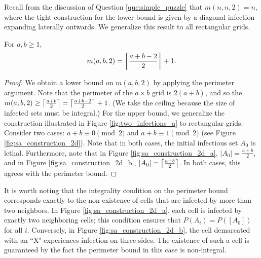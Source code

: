 Recall from the discussion of Question \ref{que:simple_puzzle} that $m(n, n,2) = n$, where the tight construction for the lower bound is given by a diagonal infection expanding laterally outwards. We generalize this result to all rectangular grids.

\begin{thm}
For $a, b \geq 1$,
$$m(a,b,2) = \ceil*{\frac{a+b-2}{2}}+1.$$
\end{thm}

\begin{proof}
We obtain a lower bound on $m(a,b,2)$ by applying the perimeter argument. Note that the perimeter of the $a \times b$ grid is $2(a+b)$, and so the $m(a,b,2) \geq \ceil*{\frac{a+b}{2}} = \ceil*{\frac{a+b-2}{2}}+1$. (We take the ceiling because the size of infected sets must be integral.) For the upper bound, we generalize the construction illustrated in Figure \ref{fig:two_infections_a} to rectangular grids. Consider two cases: $a+b \equiv 0 \pmod 2$ and $a+b \equiv 1 \pmod 2$ (see Figure \ref{fig:sa_construction_2d}). Note that in both cases, the initial infectious set $A_0$ is lethal. Furthermore, note that in Figure \ref{fig:sa_construction_2d_a}, $|A_0| = \frac{a+b}{2}$, and in Figure \ref{fig:sa_construction_2d_b}, $|A_0| = \ceil*{\frac{a+b}{2}}$. In both cases, this agrees with the perimeter bound.
\end{proof}

It is worth noting that the integrality condition on the perimeter bound corresponds exactly to the non-existence of cells that are infected by more than two neighbors. In Figure \ref{fig:sa_construction_2d_a}, each cell is infected by exactly two neighboring cells; this condition ensures that $P(A_i) = P([A_0])$ for all $i$. Conversely, in Figure \ref{fig:sa_construction_2d_b}, the cell demarcated with an ``X" experiences infection on three sides. The existence of such a cell is guaranteed by the fact the perimeter bound in this case is non-integral. 

